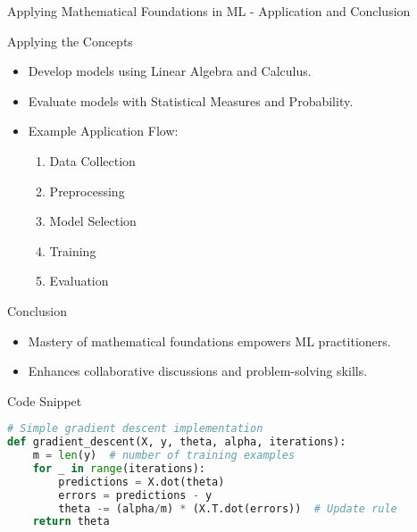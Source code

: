 \documentclass[aspectratio=169]{beamer}
\begin{document}
\begin{frame}[fragile]{Applying Mathematical Foundations in ML - Application and Conclusion}
    \begin{block}{Applying the Concepts}
        \begin{itemize}
            \item Develop models using Linear Algebra and Calculus.
            \item Evaluate models with Statistical Measures and Probability.
            \item Example Application Flow:
              \begin{enumerate}
                  \item Data Collection
                  \item Preprocessing
                  \item Model Selection
                  \item Training
                  \item Evaluation
              \end{enumerate}
        \end{itemize}
    \end{block}

    \begin{block}{Conclusion}
        \begin{itemize}
            \item Mastery of mathematical foundations empowers ML practitioners.
            \item Enhances collaborative discussions and problem-solving skills.
        \end{itemize}
    \end{block}
    
    \begin{block}{Code Snippet}
    \begin{lstlisting}[language=Python]
# Simple gradient descent implementation
def gradient_descent(X, y, theta, alpha, iterations):
    m = len(y)  # number of training examples
    for _ in range(iterations):
        predictions = X.dot(theta)
        errors = predictions - y
        theta -= (alpha/m) * (X.T.dot(errors))  # Update rule
    return theta
    \end{lstlisting}
    \end{block}
\end{frame}
\end{document}

